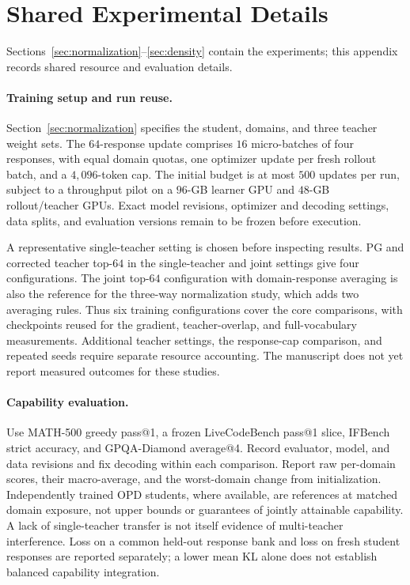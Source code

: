 \section{Shared Experimental Details}
\label{app:setup}

Sections~\ref{sec:normalization}--\ref{sec:density} contain the experiments;
this appendix records shared resource and evaluation details.

\paragraph{Training setup and run reuse.}
Section~\ref{sec:normalization} specifies the student, domains, and three
teacher weight sets. The $64$-response update comprises $16$ micro-batches
of four responses, with equal domain quotas, one optimizer update per
fresh rollout batch, and a $4{,}096$-token cap.
The initial budget is at most $500$ updates per run, subject to a
throughput pilot on a $96$-GB learner GPU and $48$-GB rollout/teacher GPUs.
Exact model revisions, optimizer and decoding settings, data splits,
and evaluation versions remain to be frozen before execution.

A representative single-teacher setting is chosen before inspecting
results. PG and corrected teacher top-$64$ in the single-teacher and
joint settings give four configurations. The joint top-$64$ configuration
with domain-response averaging is also the reference for the three-way
normalization study, which adds two averaging rules. Thus six training
configurations cover the core comparisons, with checkpoints reused for
the gradient, teacher-overlap, and full-vocabulary measurements.
Additional teacher settings, the response-cap comparison, and repeated
seeds require separate resource accounting. The manuscript does not yet
report measured outcomes for these studies.

\paragraph{Capability evaluation.}
Use MATH-500 greedy pass@1, a frozen LiveCodeBench pass@1 slice,
IFBench strict accuracy, and GPQA-Diamond average@4. Record evaluator,
model, and data revisions and fix decoding within each comparison.
Report raw per-domain scores, their macro-average, and the worst-domain
change from initialization. Independently trained OPD students, where
available, are references at matched domain exposure, not upper bounds
or guarantees of jointly attainable capability. A lack of single-teacher
transfer is not itself evidence of multi-teacher interference.
Loss on a common held-out response bank and loss on fresh student
responses are reported separately; a lower mean KL alone does not
establish balanced capability integration.

